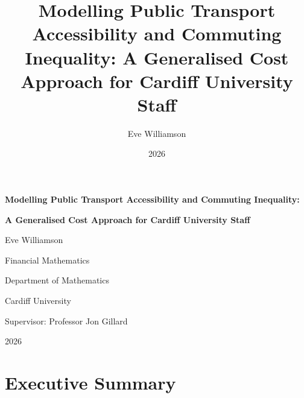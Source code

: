 \documentclass[11pt,a4paper]{article}
\title{Modelling Public Transport Accessibility and Commuting Inequality: A Generalised Cost Approach for Cardiff University Staff}
\author{Eve Williamson}
\date{2026}
\begin{document}
\begin{titlepage}
\centering

\vspace*{2.5cm}

{\Large\bfseries Modelling Public Transport Accessibility and Commuting Inequality:\par}
\vspace{0.25cm}
{\Large\bfseries A Generalised Cost Approach for Cardiff University Staff\par}

\vspace{2cm}

{\large Eve Williamson\par}
\vspace{0.4cm}


\vspace{1.5cm}

{\large Financial Mathematics\par}
\vspace{0.25cm}
{\large Department of Mathematics\par}
\vspace{0.25cm}
{\large Cardiff University\par}

\vspace{1.5cm}

{\large Supervisor: Professor Jon Gillard\par}

\vfill

{\large 2026\par}

\end{titlepage}

\section*{Executive Summary}
\end{document}
